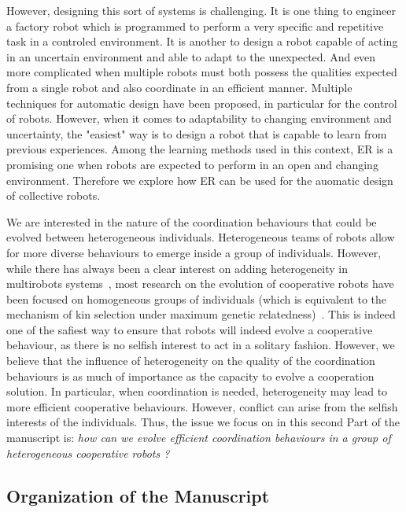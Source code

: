     However, designing this sort of systems is challenging. It is one thing to engineer a factory robot which is programmed to perform a very specific and repetitive task in a controled environment. It is another to design a robot capable of acting in an uncertain environment and able to adapt to the unexpected. And even more complicated when multiple robots must both possess the qualities expected from a single robot and also coordinate in an efficient manner. Multiple techniques for automatic design have been proposed, in particular for the control of robots. However, when it comes to adaptability to changing environment and uncertainty, the "easiest" way is to design a robot that is capable to learn from previous experiences. Among the learning methods used in this context, ER is a promising one when robots are expected to perform in an open and changing environment. Therefore we explore how ER can be used for the auomatic design of collective robots. 


    We are interested in the nature of the coordination behaviours that could be evolved between heterogeneous individuals. Heterogeneous teams of robots allow for more diverse behaviours to emerge inside a group of individuals. However, while there has always been a clear interest on adding heterogeneity in multirobots systems~\parencite{Parker1994, Parker2008}, most research on the evolution of cooperative robots have been focused on homogeneous groups of individuals (which is equivalent to the mechanism of kin selection under maximum genetic relatedness)~\parencite{Waibel2009}. This is indeed one of the safiest way to ensure that robots will indeed evolve a cooperative behaviour, as there is no selfish interest to act in a solitary fashion. However, we believe that the influence of heterogeneity on the quality of the coordination behaviours is as much of importance as the capacity to evolve a cooperation solution. In particular, when coordination is needed, heterogeneity may lead to more efficient cooperative behaviours. However, conflict can arise from the selfish interests of the individuals. Thus, the issue we focus on in this second Part of the manuscript is: \emph{how can we evolve efficient coordination behaviours in a group of heterogeneous cooperative robots ?}


  \subsection{Organization of the Manuscript}

